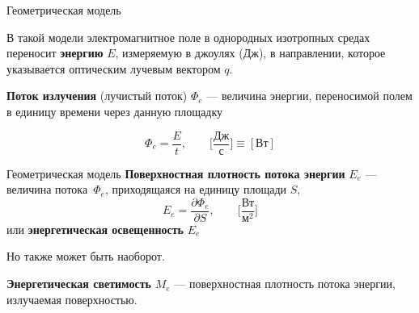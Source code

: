\documentclass{beamer}
\begin{document}
	\begin{frame}{Геометрическая модель} %

		В такой модели
		электромагнитное поле в однородных изотропных средах переносит \textbf{энергию} $E$, измеряемую в джоулях (Дж), в направлении, которое указывается оптическим лучевым вектором $q$.

		\vspace{0.15cm}

		\textbf{Поток излучения} (лучистый поток) $\Phi_e$ ---  величина энергии, переносимой полем в единицу времени через данную площадку

		\[
			\Phi_e = \frac{E}{t} 
			, \qquad
			\bigg[ \frac{\text{Дж}}{\text{с}} \bigg]  
			\equiv
			[ \text{Вт} ]
		\] 


	\end{frame}

	\begin{frame}{Геометрическая модель}
		\textbf{Поверхностная плотность потока энергии} $E_e$ --- величина потока~$\Phi_e$, приходящаяся на единицу площади $S$,
		\[
			E_e = \frac{\partial \Phi_e}{\partial S}, \qquad \bigg[ \frac{\text{Вт}}{\text{м}^2} \bigg]
		\]
		или 
		\textbf{энергетическая освещенность} $E_e$

		\vspace{0.15cm}

		Но также может быть наоборот.
		
		\textbf{Энергетическая светимость} $M_e$ --- поверхностная плотность потока энергии, излучаемая поверхностью.

	\end{frame}
\end{document}
